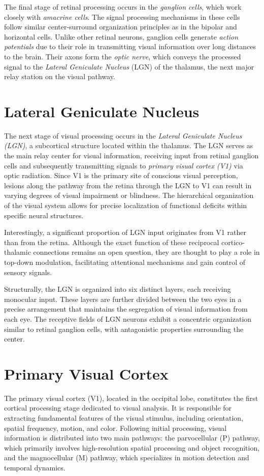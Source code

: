 The final stage of retinal processing occurs in the \emph{ganglion cells}, 
which work closely with \emph{amacrine cells}. The signal processing mechanisms
in these cells follow similar center-surround organization principles as in
the bipolar and horizontal cells. Unlike other retinal neurons, ganglion
cells generate \emph{action potentials} due to their role in transmitting
visual information over long distances to the brain. Their axons form the
\emph{optic nerve}, which conveys the processed signal to the
\emph{Lateral Geniculate Nucleus} (LGN) of the thalamus, the next major relay
station on the visual pathway.

\section{Lateral Geniculate Nucleus}
\label{sec:lgn}
The next stage of visual processing occurs in the \emph{Lateral Geniculate Nucleus (LGN)}, 
a subcortical structure located within the thalamus. The LGN serves as the main relay center
for visual information, receiving input from retinal ganglion cells and
subsequently transmitting signals to \emph{primary visual cortex (V1)} via optic radiation. 
Since V1 is the primary site of conscious visual perception, lesions along the pathway from the
retina through the LGN to V1 can result in varying degrees of visual impairment or blindness. 
The hierarchical organization of the visual system allows for precise localization of functional
deficits within specific neural structures.

Interestingly, a significant proportion of LGN input originates from V1 rather than from the retina. 
Although the exact function of these reciprocal cortico-thalamic connections remains an open question, 
they are thought to play a role in top-down modulation, facilitating attentional mechanisms
and gain control of sensory signals.

Structurally, the LGN is organized into six distinct layers, each receiving monocular input. 
These layers are further divided between the two eyes in a precise arrangement that maintains
the segregation of visual information from each eye. The receptive fields of LGN neurons exhibit a
concentric organization similar to retinal ganglion cells, with antagonistic properties surrounding the center.

\section{Primary Visual Cortex}
\label{sec:v1}
The primary visual cortex (V1), located in the occipital lobe, constitutes the first
cortical processing stage dedicated to visual analysis. It is responsible for extracting
fundamental features of the visual stimulus, including orientation, spatial frequency, 
motion, and color. Following initial processing, visual information is distributed into two main pathways: the parvocellular (P) pathway, which primarily involves
high-resolution spatial processing and object recognition, and the magnocellular (M) pathway, 
which specializes in motion detection and temporal dynamics.

